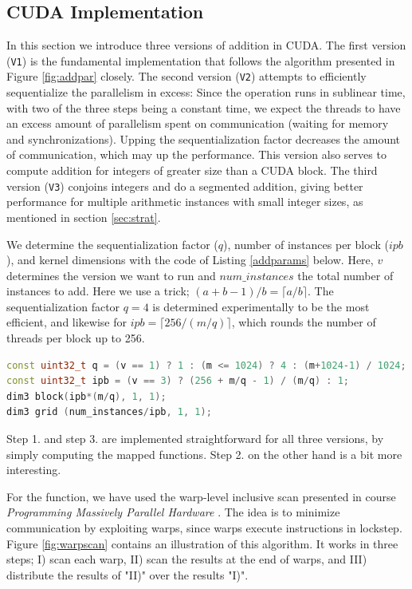 \subsection{CUDA Implementation}
\label{subsec:addcud}

In this section we introduce three versions of addition in CUDA. The first
version (\texttt{V1}) is the fundamental implementation that follows the
algorithm presented in Figure \ref{fig:addpar} closely. The second version
(\texttt{V2}) attempts to efficiently sequentialize the parallelism in excess:
Since the operation runs in sublinear time, with two of the three steps being a
constant time, we expect the threads to have an excess amount of parallelism
spent on communication (waiting for memory and synchronizations). Upping the
sequentialization factor decreases the amount of communication, which may up the
performance. This version also serves to compute addition for integers of
greater size than a CUDA block. The third version (\texttt{V3}) conjoins
integers and do a segmented addition, giving better performance for multiple
arithmetic instances with small integer sizes, as mentioned in section
\ref{sec:strat}.

We determine the sequentialization factor ($q$), number of instances per block
($\mathit{ipb}$), and kernel dimensions with the code of Listing \ref{addparams}
below. Here, $v$ determines the version we want to run and
$\mathit{num\_instances}$ the total number of instances to add. Here we use a
trick; $(a + b - 1) / b = \lceil a / b \rceil$. The sequentialization factor
$q=4$ is determined experimentally to be the most efficient, and likewise for
$\mathit{ipb} = \lceil 256 / (m/q) \rceil$, which rounds the number of threads per block
up to 256.
\begin{lstlisting}[language=CPP,caption={CUDA addition parameters and kernel dimensions.},label={addparams}]
const uint32_t q = (v == 1) ? 1 : (m <= 1024) ? 4 : (m+1024-1) / 1024;
const uint32_t ipb = (v == 3) ? (256 + m/q - 1) / (m/q) : 1;
dim3 block(ipb*(m/q), 1, 1);
dim3 grid (num_instances/ipb, 1, 1);
\end{lstlisting}

Step 1. and step 3. are implemented straightforward for all three versions, by
simply computing the mapped functions. Step 2. on the other hand is a bit more
interesting.

For the  function, we have used the warp-level inclusive scan
presented in course \textit{Programming Massively Parallel Hardware}
\cite{PMPH}. The idea is to minimize communication by exploiting warps, since
warps execute instructions in lockstep. Figure \ref{fig:warpscan} contains an
illustration of this algorithm. It works in three steps; I) scan each warp, II)
scan the results at the end of warps, and III) distribute the results of "II)"
over the results "I)".


